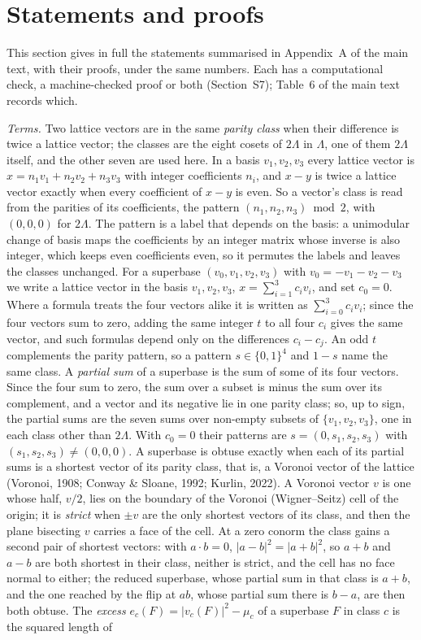 \documentclass[preprint,pdf]{iucr}          %
\begin{document}
\section{Statements and proofs}\label{si:proofs}

This section gives in full the statements summarised in Appendix~A of the main text, with their proofs, under the same numbers. Each has a computational check, a machine-checked proof or both (Section~S7); Table~6 of the main text records which.

\emph{Terms.} Two lattice vectors are in the same \emph{parity class} when their difference is twice a lattice vector; the classes are the eight cosets of $2\Lambda$ in $\Lambda$, one of them $2\Lambda$ itself, and the other seven are used here. In a basis $v_1,v_2,v_3$ every lattice vector is $x=n_1v_1+n_2v_2+n_3v_3$ with integer coefficients $n_i$, and $x-y$ is twice a lattice vector exactly when every coefficient of $x-y$ is even. So a vector's class is read from the parities of its coefficients, the pattern $(n_1,n_2,n_3)\bmod 2$, with $(0,0,0)$ for $2\Lambda$. The pattern is a label that depends on the basis: a unimodular change of basis maps the coefficients by an integer matrix whose inverse is also integer, which keeps even coefficients even, so it permutes the labels and leaves the classes unchanged. For a superbase $(v_0,v_1,v_2,v_3)$ with $v_0=-v_1-v_2-v_3$ we write a lattice vector in the basis $v_1,v_2,v_3$, $x=\sum_{i=1}^3c_iv_i$, and set $c_0=0$. Where a formula treats the four vectors alike it is written as $\sum_{i=0}^3c_iv_i$; since the four vectors sum to zero, adding the same integer $t$ to all four $c_i$ gives the same vector, and such formulas depend only on the differences $c_i-c_j$. An odd $t$ complements the parity pattern, so a pattern $s\in\{0,1\}^4$ and $1-s$ name the same class. A \emph{partial sum} of a superbase is the sum of some of its four vectors. Since the four sum to zero, the sum over a subset is minus the sum over its complement, and a vector and its negative lie in one parity class; so, up to sign, the partial sums are the seven sums over non-empty subsets of $\{v_1,v_2,v_3\}$, one in each class other than $2\Lambda$. With $c_0=0$ their patterns are $s=(0,s_1,s_2,s_3)$ with $(s_1,s_2,s_3)\ne(0,0,0)$. A superbase is obtuse exactly when each of its partial sums is a shortest vector of its parity class, that is, a Voronoi vector of the lattice (Voronoi, 1908; Conway \& Sloane, 1992; Kurlin, 2022). A Voronoi vector $v$ is one whose half, $v/2$, lies on the boundary of the Voronoi (Wigner--Seitz) cell of the origin; it is \emph{strict} when $\pm v$ are the only shortest vectors of its class, and then the plane bisecting $v$ carries a face of the cell. At a zero conorm the class gains a second pair of shortest vectors: with $a\cdot b=0$, $|a-b|^2=|a+b|^2$, so $a+b$ and $a-b$ are both shortest in their class, neither is strict, and the cell has no face normal to either; the reduced superbase, whose partial sum in that class is $a+b$, and the one reached by the flip at $ab$, whose partial sum there is $b-a$, are then both obtuse. The \emph{excess} $e_c(F)=|v_c(F)|^2-\mu_c$ of a superbase $F$ in class $c$ is the squared length of 
\end{document}

